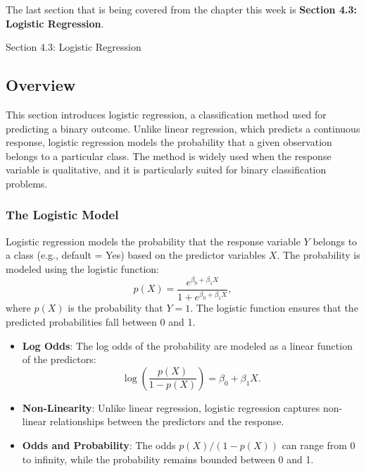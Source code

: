The last section that is being covered from the chapter this week is \textbf{Section 4.3: Logistic Regression}.

\begin{notes}{Section 4.3: Logistic Regression}
    \subsection*{Overview}

    This section introduces logistic regression, a classification method used for predicting a binary outcome. Unlike linear regression, which predicts a continuous response, logistic regression models 
    the probability that a given observation belongs to a particular class. The method is widely used when the response variable is qualitative, and it is particularly suited for binary classification problems.
    
    \subsubsection*{The Logistic Model}
    
    Logistic regression models the probability that the response variable $Y$ belongs to a class (e.g., default = Yes) based on the predictor variables $X$. The probability is modeled using the logistic function:
    \[
    p(X) = \frac{e^{\beta_0 + \beta_1 X}}{1 + e^{\beta_0 + \beta_1 X}},
    \]
    where $p(X)$ is the probability that $Y = 1$. The logistic function ensures that the predicted probabilities fall between 0 and 1.
    
    \begin{highlight}
        \begin{itemize}
            \item \textbf{Log Odds}: The log odds of the probability are modeled as a linear function of the predictors:
            \[
            \log\left(\frac{p(X)}{1 - p(X)}\right) = \beta_0 + \beta_1 X.
            \]
            \item \textbf{Non-Linearity}: Unlike linear regression, logistic regression captures non-linear relationships between the predictors and the response.
            \item \textbf{Odds and Probability}: The odds $p(X)/(1 - p(X))$ can range from 0 to infinity, while the probability remains bounded between 0 and 1.
        \end{itemize}
    \end{highlight}
    

\end{notes}

